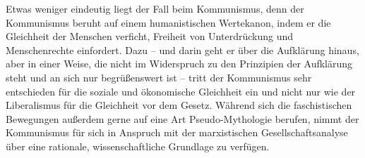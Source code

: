 \documentclass[12pt,a4paper,ngerman]{article}
\begin{document}
Etwas weniger eindeutig liegt der Fall beim Kommunismus, denn der Kommunismus
beruht auf einem humanistischen Wertekanon, indem er die Gleichheit der
Menschen verficht, Freiheit von Unterdrückung und Menschenrechte
einfordert. Dazu -- und darin geht er über die Aufklärung hinaus, aber in
einer Weise, die nicht im Widerspruch zu den Prinzipien der Aufklärung steht
und an sich nur begrüßenswert ist -- tritt der Kommunismus sehr entschieden
für die soziale und ökonomische Gleichheit ein und nicht nur wie der
Liberalismus für die Gleichheit vor dem Gesetz. Während sich die
faschistischen Bewegungen außerdem gerne auf eine Art Pseudo-Mythologie
berufen, nimmt der Kommunismus für sich in Anspruch mit der marxistischen
Gesellschaftsanalyse über eine rationale, wissenschaftliche Grundlage zu
verfügen. 

\end{document}
